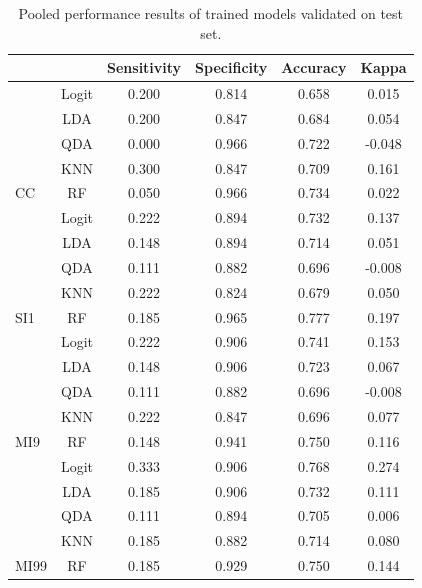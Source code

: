 \documentclass[12pt,]{article}
\begin{document}
\begin{table}[!h]

\caption{\label{tab:unnamed-chunk-7}\label{tab:metrics} Pooled performance results of trained models validated on test set.}
\centering
\fontsize{10}{12}\selectfont
\begin{tabular}{lccccc}
\toprule
 &  & Sensitivity & Specificity & Accuracy & Kappa\\
\midrule
 & Logit & 0.200 & 0.814 & 0.658 & 0.015\\

 & LDA & 0.200 & 0.847 & 0.684 & 0.054\\

 & QDA & 0.000 & 0.966 & 0.722 & -0.048\\

 & KNN & 0.300 & 0.847 & 0.709 & 0.161\\

\multirow{-5}{*}{\raggedright\arraybackslash CC} & RF & 0.050 & 0.966 & 0.734 & 0.022\\
\cmidrule{1-6}
 & Logit & 0.222 & 0.894 & 0.732 & 0.137\\

 & LDA & 0.148 & 0.894 & 0.714 & 0.051\\

 & QDA & 0.111 & 0.882 & 0.696 & -0.008\\

 & KNN & 0.222 & 0.824 & 0.679 & 0.050\\

\multirow{-5}{*}{\raggedright\arraybackslash SI1} & RF & 0.185 & 0.965 & 0.777 & 0.197\\
\cmidrule{1-6}
 & Logit & 0.222 & 0.906 & 0.741 & 0.153\\

 & LDA & 0.148 & 0.906 & 0.723 & 0.067\\

 & QDA & 0.111 & 0.882 & 0.696 & -0.008\\

 & KNN & 0.222 & 0.847 & 0.696 & 0.077\\

\multirow{-5}{*}{\raggedright\arraybackslash MI9} & RF & 0.148 & 0.941 & 0.750 & 0.116\\
\cmidrule{1-6}
 & Logit & 0.333 & 0.906 & 0.768 & 0.274\\

 & LDA & 0.185 & 0.906 & 0.732 & 0.111\\

 & QDA & 0.111 & 0.894 & 0.705 & 0.006\\

 & KNN & 0.185 & 0.882 & 0.714 & 0.080\\

\multirow{-5}{*}{\raggedright\arraybackslash MI99} & RF & 0.185 & 0.929 & 0.750 & 0.144\\
\bottomrule
\end{tabular}
\end{table}
\end{document}
